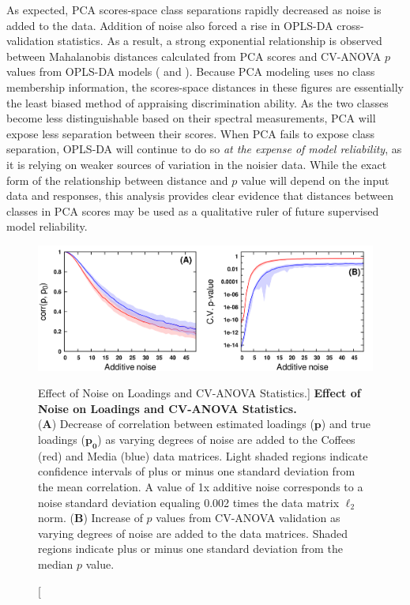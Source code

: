 \begin{doublespace}
As expected, PCA scores-space class separations rapidly decreased as noise is
added to the data. Addition of noise also forced a rise in OPLS-DA
cross-validation statistics. As a result, a strong exponential relationship
is observed between Mahalanobis distances calculated from PCA scores and
CV-ANOVA $p$ values from OPLS-DA models ( and
). Because PCA modeling uses no class membership
information, the scores-space distances in these figures are essentially the
least biased method of appraising discrimination ability. As the two classes
become less distinguishable based on their spectral measurements, PCA will
expose less separation between their scores. When PCA fails to expose class
separation, OPLS-DA will continue to do so
\emph{at the expense of model reliability}, as it is relying on weaker
sources of variation in the noisier data. While the exact form of the
relationship between distance and $p$ value will depend on the input data and
responses, this analysis provides clear evidence that distances between classes
in PCA scores may be used as a qualitative ruler of future supervised model
reliability.
\end{doublespace}

\begin{figure}[ht!]
\includegraphics[width=6in]{figs/apps/17-lines.png}
\caption
      [Effect of Noise on Loadings and CV-ANOVA Statistics.]{
  {\bf Effect of Noise on Loadings and CV-ANOVA Statistics.}
  \\
  ({\bf A}) Decrease of correlation between estimated loadings ($\mathbf{p}$)
  and true loadings ($\mathbf{p_0}$) as varying degrees of noise are added to
  the Coffees (red) and Media (blue) data matrices. Light shaded regions
  indicate confidence intervals of plus or minus one standard deviation from
  the mean correlation. A value of 1x additive noise corresponds to a noise
  standard deviation equaling 0.002 times the data matrix $\ell_2$ norm.
  ({\bf B}) Increase of $p$ values from CV-ANOVA validation as varying degrees
  of noise are added to the data matrices. Shaded regions indicate plus or
  minus one standard deviation from the median $p$ value.
}
\label{figure.4.17}
\end{figure}

